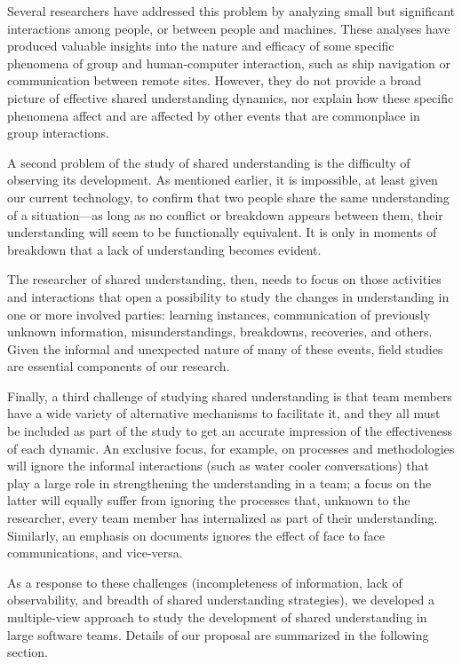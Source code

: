 Several researchers have addressed this problem by analyzing small but significant interactions among people, or between people and machines. These analyses have produced valuable insights into the nature and efficacy of some specific phenomena of group and human-computer interaction, such as ship navigation \cite{Hutchins1995} or communication between remote sites. However, they do not provide a broad picture of effective shared understanding dynamics, nor explain how these specific phenomena affect and are affected by other events that are commonplace in group interactions.

A second problem of the study of shared understanding is the difficulty of observing its development. As mentioned earlier, it is impossible, at least given our current technology, to confirm that two people share the same understanding of a situation---as long as no conflict or breakdown appears between them, their understanding will seem to be functionally equivalent. It is only in moments of breakdown that a lack of understanding becomes evident.

The researcher of shared understanding, then, needs to focus on those activities and interactions that open a possibility to study the changes in understanding in one or more involved parties: learning instances, communication of previously unknown information, misunderstandings, breakdowns, recoveries, and others. Given the informal and unexpected nature of many of these events, field studies are essential components of our research.

Finally, a third challenge of studying shared understanding is that team members have a wide variety of alternative mechanisms to facilitate it, and they all must be included as part of the study to get an accurate impression of the effectiveness of each dynamic. An exclusive focus, for example, on processes and methodologies will ignore the informal interactions (such as water cooler conversations) that play a large role in strengthening the understanding in a team; a focus on the latter will equally suffer from ignoring the processes that, unknown to the researcher, every team member has internalized as part of their understanding. Similarly, an emphasis on documents ignores the effect of face to face communications, and vice-versa.

As a response to these challenges (incompleteness of information, lack of observability, and breadth of shared understanding strategies), we developed a multiple-view approach to study the development of shared understanding in large software teams. Details of our proposal are summarized in the following section.

